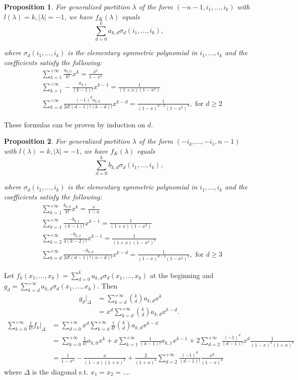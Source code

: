 \documentclass{article}
\newtheorem{prop}{Proposition}[theorem]
\begin{document}
\begin{prop}
For generalized partition $\lambda$ of the form $(-n-1,i_1,\ldots,i_k)$ with $\mathit{l}(\lambda)=k,|\lambda|=-1$, we have $f_K(\lambda)$ equals
\[\sum_{d=0}^k a_{k,d}\sigma_d(i_1,\ldots,i_k),\]

where $\sigma_d(i_1,\ldots,i_k)$ is the elementary symmetric polynomial in $i_1,\ldots,i_k$ and the coefficients satisfy the following:
\[
\begin{aligned}
&\sum_{k=1}^{+\infty}\frac{a_{k,0}}{k!}x^k = \frac{x^2}{1-x^2}\\
&\sum_{k=1}^{+\infty}-\frac{a_{k,1}}{(k-1)!}x^{k-1} = \frac{1}{(1+x)(1-x^2)}\\
&\sum_{k=d}^{+\infty}\frac{(-1)^da_{k,d}}{2d!(d-1)!(k-d)!}x^{k-d} = \frac{1}{(1-x)^{d-3}(1-x^2)^3}, \text{ for } d\geqslant2
\end{aligned}
\]
\end{prop}
These formulas can be proven by induction on $d$.

\begin{prop}
For generalized partition $\lambda$ of the form $(-i_k,\ldots,-i_1,n-1)$ with $\mathit{l}(\lambda)=k,|\lambda|=-1$, we have $f_K(\lambda)$ equals
\[\sum_{d=0}^k b_{k,d}\sigma_d(i_1,\ldots,i_k),\]

where $\sigma_d(i_1,\ldots,i_k)$ is the elementary symmetric polynomial in $i_1,\ldots,i_k$ and the coefficients satisfy the following:
\[
\begin{aligned}
&\sum_{k=1}^{+\infty}\frac{b_{k,0}}{k!}x^k = \frac{x}{1-x}\\
&\sum_{k=1}^{+\infty}\frac{-b_{k,1}}{(k-1)!}x^{k-1} = \frac{1}{(1+x)(1-x^2)}\\
&\sum_{k=2}^{+\infty}\frac{-b_{k,2}}{4(k-2)!}x^{k-1} = \frac{1}{(1+x)(1-x^2)^2}\\
&\sum_{k=d}^{+\infty}\frac{-b_{k,d}}{2d!(d-1)!(n-d)!}x^{k-d} = \frac{1}{(1-x)^{d-3}(1-x^2)^3}, \text{ for } d\geqslant 3
\end{aligned}
\]
\end{prop}

Let $f_k(x_1,\ldots,x_k)=\sum_{d=0}^ka_{k,d}\sigma_d(x_1,\ldots,x_k)$ at the beginning and $g_d = \sum_{k=d}^{+\infty}a_{k,d}\sigma_d(x_1,\ldots,x_k)$. Then 
\[
\begin{aligned}
g_d|_\Delta&=\sum_{k=d}^{+\infty}\binom{k}{d}a_{k,d}x^k\\
&=x^d\sum_{k=d}^{+\infty}\binom{k}{d}a_{k,d}x^{k-d}.
\end{aligned}
\]
\[
\begin{aligned}
\sum_{k=0}^{+\infty}\frac{1}{k!}f_k|_\Delta&=\sum_{d=0}^{+\infty}x^d\sum_{k=d}^{+\infty}\frac{1}{k!}\binom{k}{d}a_{k,d}x^{k-d}\\
&=\sum_{k=0}^{+\infty}\frac{1}{k!}a_{k,0}x^{k}+x\sum_{k=1}^{+\infty}\frac{1}{(k-1)!}a_{k,1}x^{k-1}+2\sum_{d=2}^{+\infty}\frac{(-1)^d}{(d-1)!}x^d\frac{1}{(1-x)^d(1+x)^3}\\
&=\frac{1}{1-x^2}-\frac{x}{(1-x)(1+x)^2}+\frac{2}{(1+x)^3}\sum_{d=2}^{+\infty}\frac{(-1)^d}{(d-1)!}\frac{x^d}{(1-x)^d}
\end{aligned}
\]
where $\Delta$ is the diagonal s.t. $x_1=x_2=\ldots$.
\end{document}
